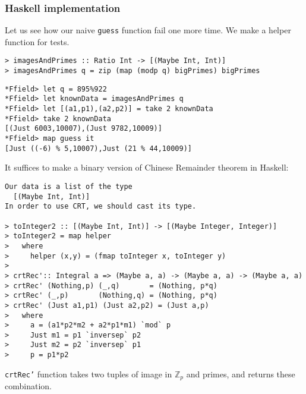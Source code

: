 \documentclass[11pt]{book}
\begin{document}

\subsubsection{Haskell implementation}
Let us see how our naive \texttt{guess} function fail one more time.
We make a helper function for tests.
\begin{verbatim}
> imagesAndPrimes :: Ratio Int -> [(Maybe Int, Int)]
> imagesAndPrimes q = zip (map (modp q) bigPrimes) bigPrimes
\end{verbatim}

\begin{verbatim}
*Ffield> let q = 895%922
*Ffield> let knownData = imagesAndPrimes q
*Ffield> let [(a1,p1),(a2,p2)] = take 2 knownData
*Ffield> take 2 knownData
[(Just 6003,10007),(Just 9782,10009)]
*Ffield> map guess it
[Just ((-6) % 5,10007),Just (21 % 44,10009)]
\end{verbatim}

It suffices to make a binary version of Chinese Remainder theorem in Haskell:
\begin{verbatim}
Our data is a list of the type
  [(Maybe Int, Int)]
In order to use CRT, we should cast its type.

> toInteger2 :: [(Maybe Int, Int)] -> [(Maybe Integer, Integer)]
> toInteger2 = map helper
>   where 
>     helper (x,y) = (fmap toInteger x, toInteger y)
>
> crtRec':: Integral a => (Maybe a, a) -> (Maybe a, a) -> (Maybe a, a)
> crtRec' (Nothing,p) (_,q)       = (Nothing, p*q)
> crtRec' (_,p)       (Nothing,q) = (Nothing, p*q)
> crtRec' (Just a1,p1) (Just a2,p2) = (Just a,p)
>   where
>     a = (a1*p2*m2 + a2*p1*m1) `mod` p
>     Just m1 = p1 `inversep` p2 
>     Just m2 = p2 `inversep` p1
>     p = p1*p2

\end{verbatim}
\texttt{crtRec'} function takes two tuples of image in $\mathbb{Z}_p$ and primes, and returns these combination.
\end{document}
